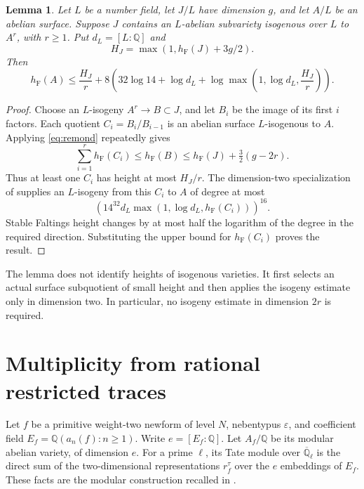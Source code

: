 \documentclass[11pt,a4paper]{article}
\newtheorem{lemma}[theorem]{Lemma}
\newcommand{\Q}{\mathbb Q}
\newcommand{\hF}{h_{\mathrm F}}
\begin{document}
\begin{lemma}\label{lem:average}
Let \(L\) be a number field, let \(J/L\) have dimension \(g\), and
let \(A/L\) be an abelian surface. Suppose \(J\) contains an
\(L\)-abelian subvariety isogenous over \(L\) to \(A^r\), with \(r\ge1\).
Put \(d_L=[L:\Q]\) and
\[
 H_J=\max(1,\hF(J)+3g/2).
\]
Then
\[
 \hF(A)\le \frac{H_J}{r}
 +8\left(32\log14+\log d_L+
       \log\max\left(1,\log d_L,\frac{H_J}{r}\right)\right).
\]
\end{lemma}
\begin{proof}
Choose an \(L\)-isogeny \(A^r\to B\subset J\), and let \(B_i\)
be the image of its first \(i\) factors. Each quotient
\(C_i=B_i/B_{i-1}\) is an abelian surface \(L\)-isogenous to \(A\).
Applying \eqref{eq:remond} repeatedly gives
\[
 \sum_{i=1}^r\hF(C_i)\le\hF(B)
 \le\hF(J)+\tfrac32(g-2r).
\]
Thus at least one \(C_i\) has height at most \(H_J/r\).
The dimension-two specialization of
\cite[Theorem~1.9(1)]{GaudronRemond} supplies an \(L\)-isogeny
from this \(C_i\) to \(A\) of degree at most
\[
 \left(14^{32}d_L
       \max(1,\log d_L,\hF(C_i))\right)^{16}.
\]
Stable Faltings height changes by at most half the logarithm of
the degree in the required direction. Substituting the upper bound
for \(\hF(C_i)\) proves the result.
\end{proof}

The lemma does not identify heights of isogenous varieties.
It first selects an actual surface subquotient of small height and
then applies the isogeny estimate only in dimension two. In particular,
no isogeny estimate in dimension \(2r\) is required.

\section{Multiplicity from rational restricted traces}

Let \(f\) be a primitive weight-two newform of level \(N\), nebentypus
\(\varepsilon\), and coefficient field
\(E_f=\Q(a_n(f):n\ge1)\). Write \(e=[E_f:\Q]\).
Let \(A_f/\Q\) be its modular abelian variety, of dimension \(e\).
For a prime \(\ell\), its Tate module over \(\overline{\Q}_\ell\)
is the direct sum of the two-dimensional representations \(r_f^\tau\)
over the \(e\) embeddings of \(E_f\). These facts are the modular
construction recalled in \cite[Section~3]{Ribet}.
\end{document}

